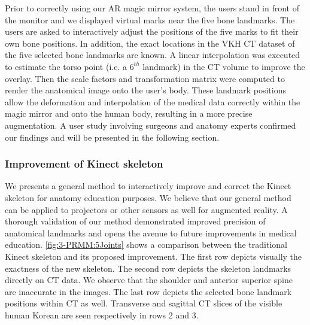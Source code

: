 Prior to correctly using our AR magic mirror system, the users stand in front of the monitor and we displayed virtual marks near the five bone landmarks. The users are asked to interactively adjust the positions of the five marks to fit their own bone positions. In addition, the exact locations in the VKH CT dataset of the five selected bone landmarks are known. A linear interpolation was executed to estimate the torso point (i.e. a $6^{th}$ landmark) in the CT volume to improve the overlay. Then the scale factors and transformation matrix were computed to render the anatomical image onto the user's body. These landmark positions allow the deformation and interpolation of the medical data correctly within the magic mirror and onto the human body, resulting in a more precise augmentation. A user study involving surgeons and anatomy experts confirmed our findings and will be presented in the following section.

\subsubsection{Improvement of Kinect skeleton}
We presents a general method to interactively improve and correct the Kinect skeleton for anatomy education purposes. We believe that our general method can be applied to projectors or other sensors as well for augmented reality. A thorough validation of our method demonstrated improved precision of anatomical landmarks and opens the avenue to future improvements in medical education. 
\figurename{\ref{fig:3-PRMM:5Joints}} shows a comparison between the traditional Kinect skeleton and its proposed improvement. The first row depicts visually the exactness of the new skeleton. The second row depicts the skeleton landmarks directly on CT data. We observe that the shoulder and anterior superior spine are inaccurate in the images. The last row depicts the selected bone landmark positions within CT as well. Transverse and sagittal CT slices of the visible human Korean are seen respectively in rows 2 and 3.


